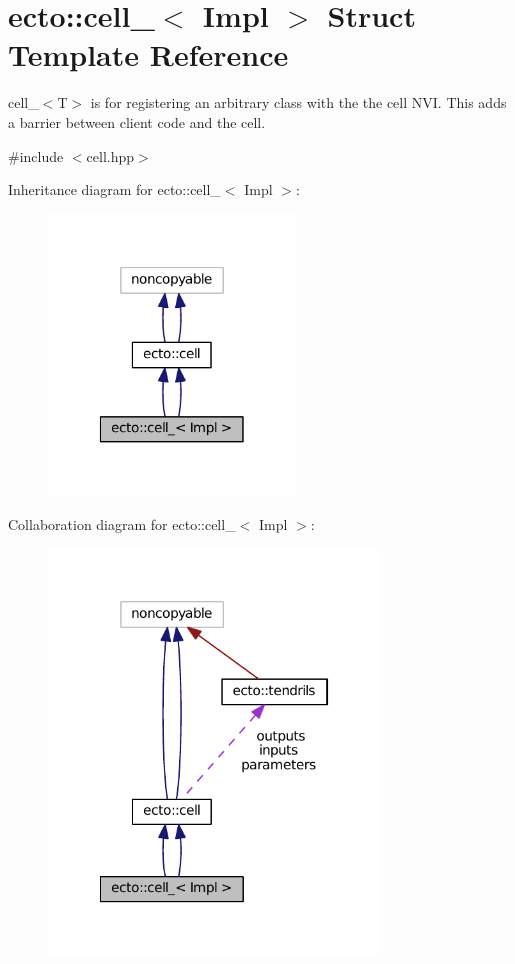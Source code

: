\hypertarget{structecto_1_1cell__}{\section{ecto\-:\-:cell\-\_\-$<$ Impl $>$ Struct Template Reference}
\label{structecto_1_1cell__}
}


cell\-\_\-$<$\-T$>$ is for registering an arbitrary class with the the cell N\-V\-I. This adds a barrier between client code and the cell.  




{\ttfamily \#include $<$cell.\-hpp$>$}



Inheritance diagram for ecto\-:\-:cell\-\_\-$<$ Impl $>$\-:\nopagebreak
\begin{figure}[H]
\begin{center}
\leavevmode
\includegraphics[width=186pt]{structecto_1_1cell____inherit__graph}
\end{center}
\end{figure}


Collaboration diagram for ecto\-:\-:cell\-\_\-$<$ Impl $>$\-:\nopagebreak
\begin{figure}[H]
\begin{center}
\leavevmode
\includegraphics[width=249pt]{structecto_1_1cell____coll__graph}
\end{center}
\end{figure}
